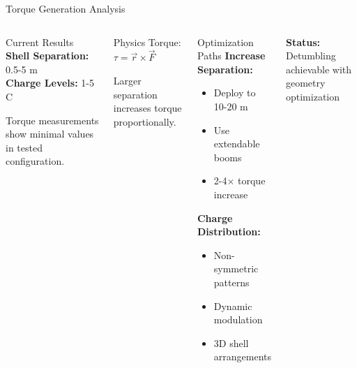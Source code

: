 \documentclass[aspectratio=169]{beamer}
\begin{document}
\begin{frame}{Torque Generation Analysis}
\begin{columns}[t]
\begin{block}{Current Results}
\textbf{Shell Separation:} 0.5-5 m\\
\textbf{Charge Levels:} 1-5 C

\vspace{0.2cm}
Torque measurements show minimal values in tested configuration.
\end{block}

\begin{block}{Physics}
Torque: $\tau = \vec{r} \times \vec{F}$

\vspace{0.2cm}
Larger separation increases torque proportionally.
\end{block}

\begin{block}{Optimization Paths}
\textbf{Increase Separation:}
\begin{itemize}
    \item Deploy to 10-20 m
    \item Use extendable booms
    \item 2-4$\times$ torque increase
\end{itemize}

\vspace{0.2cm}
\textbf{Charge Distribution:}
\begin{itemize}
    \item Non-symmetric patterns
    \item Dynamic modulation
    \item 3D shell arrangements
\end{itemize}
\end{block}

\textbf{Status:}\\
Detumbling achievable with geometry optimization
\end{columns}
\end{frame}
\end{document}
